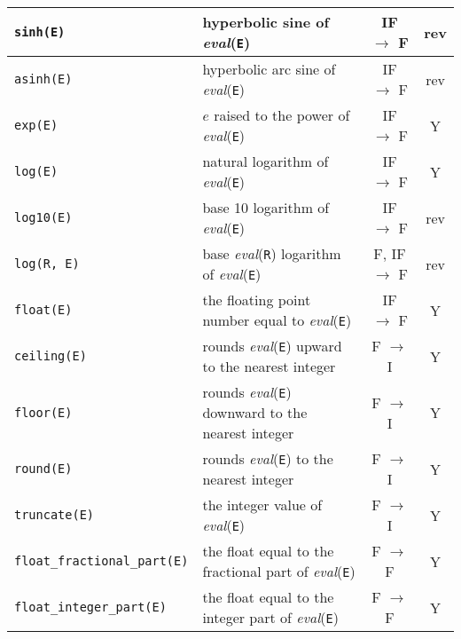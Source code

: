 \begin{supertabular}{|l|L{7.5cm}|c|c|}
\hline

\texttt{sinh(E)} & hyperbolic sine of \textit{eval}(\texttt{E}) & IF $\rightarrow$ F & rev \\

\hline

\texttt{asinh(E)} & hyperbolic arc sine of \textit{eval}(\texttt{E}) & IF $\rightarrow$ F & rev \\

\hline

\texttt{exp(E)} & $e$ raised to the power of \textit{eval}(\texttt{E}) &
IF $\rightarrow$ F & Y \\

\hline

\texttt{log(E)} & natural logarithm of \textit{eval}(\texttt{E}) & IF
$\rightarrow$ F & Y \\

\hline

\texttt{log10(E)} & base 10 logarithm of \textit{eval}(\texttt{E}) & IF
$\rightarrow$ F & rev \\

\hline

\texttt{log(R, E)} & base \textit{eval}(\texttt{R}) logarithm of \textit{eval}(\texttt{E})  & F, IF
$\rightarrow$ F & rev \\

\hline

\texttt{float(E)} & the floating point number equal to
\textit{eval}(\texttt{E}) & IF $\rightarrow$ F & Y \\

\hline

\texttt{ceiling(E)} & rounds \textit{eval}(\texttt{E}) upward to the
nearest integer & F $\rightarrow$ I & Y \\

\hline

\texttt{floor(E)} & rounds \textit{eval}(\texttt{E}) downward to the
nearest integer & F $\rightarrow$ I & Y \\

\hline

\texttt{round(E)} & rounds \textit{eval}(\texttt{E}) to the nearest integer
& F $\rightarrow$ I & Y \\

\hline

\texttt{truncate(E)} & the integer value of \textit{eval}(\texttt{E}) & F
$\rightarrow$ I & Y \\

\hline

\texttt{float\_fractional\_part(E)} & the float equal to the fractional part
of \textit{eval}(\texttt{E}) & F $\rightarrow$ F & Y \\

\hline

\texttt{float\_integer\_part(E)} & the float equal to the integer part of
\textit{eval}(\texttt{E}) & F $\rightarrow$ F & Y \\

\hline
\end{supertabular}

